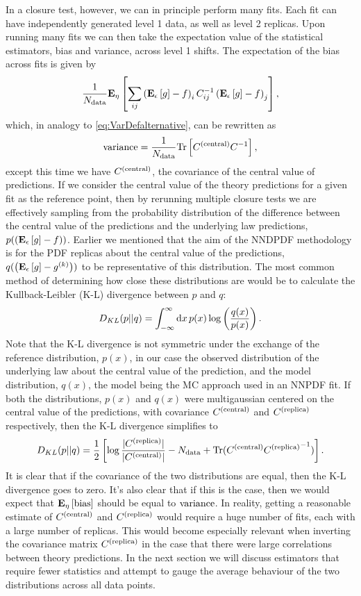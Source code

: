 In a closure test, however, we can in principle perform many
fits. Each fit can have independently generated level 1 data, as well as
level 2 replicas. Upon running many fits we can then take the expectation value
of the statistical estimators, bias and variance, across level 1 shifts. The expectation
of the bias across fits is given by
\begin{equation}
    \frac{1}{N_{\rm data}} \mathbf{E}_{\eta}\left[  \sum_{ij} \left( \mathbf{E}_{\epsilon}\left[ g \right] - f \right)_i C^{-1}_{ij} \left( \mathbf{E}_{\epsilon}\left[ g \right] - f \right)_j  \right],
\end{equation}
which, in analogy to \eqref{eq:VarDefalternative}, can be rewritten as
\begin{equation}
    \label{eq:VarDefalternative}
    {\rm variance} = \frac{1}{N_{\rm data}} {\rm Tr} \left[ C^{(\rm central)} C^{-1}_{} \right],
\end{equation}
except this time we have $C^{(\rm central)}$, the covariance of the central value
of predictions. If we consider the central value of the theory predictions for
a given fit as the reference point, then by rerunning multiple closure tests
we are effectively sampling from the probability distribution of the
difference between the central value of the predictions and the underlying law
predictions, $p(\left( \mathbf{E}_{\epsilon}\left[ g \right] - f \right))$. Earlier we mentioned that the aim of the NNDPDF
methodology is for the PDF replicas about the central value of the predictions,
$q(\left( \mathbf{E}_{\epsilon}\left[ g \right] - g^{(k)}\right))$ to be representative of this distribution. The most common
method of determining how close these distributions are would be to calculate
the Kullback-Leibler (K-L) divergence between $p$ and $q$:
\begin{equation}
    D_{KL}(p || q) = \int_{-\infty}^{\infty} {\rm d} x \, p(x) \log \left(\frac{q(x)}{p(x)} \right).
\end{equation}
Note that the K-L divergence is not symmetric under the exchange of the reference
distribution, $p(x)$, in our case the observed distribution of the underlying law
about the central value of the prediction, and the model distribution, $q(x)$,
the model being the MC approach used in an NNPDF fit. If both the distributions,
$p(x)$ and $q(x)$ were multigaussian centered on the central value of the
predictions, with covariance $C^{(\rm central)}$ and
$C^{(\rm replica)}$ respectively, then the K-L divergence simplifies to
\begin{equation}
    D_{KL}(p || q) = \frac{1}{2} \left[
        \log\frac{|C^{(\rm replica)}|}{|C^{(\rm central)}|}
        - N_{\rm data}
        + {\rm Tr} (C^{(\rm central)} {C^{(\rm replica)}}^{-1})
        \right].
\end{equation}
It is clear that if the covariance of the two distributions are equal, then
the K-L divergence goes to zero. It's also clear that if this is the case,
then we would expect that $\mathbf{E}_{\eta}\left[ {\rm bias} \right]$ should be equal to ${\rm variance}$. In reality,
getting a reasonable estimate of $C^{(\rm central)}$ and $C^{(\rm replica)}$ would require a huge
number of fits, each with a large number of replicas. This would become
especially relevant when inverting the covariance matrix $C^{(\rm replica)}$ in the case
that there were large correlations between theory predictions. In the next
section we will discuss estimators that require fewer statistics and attempt
to gauge the average behaviour of the two distributions across all data points.

